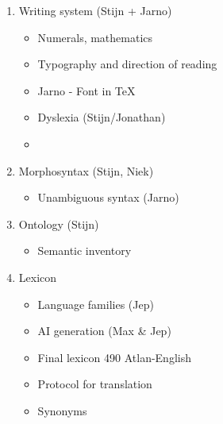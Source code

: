 \documentclass[a3paper]{article}
\begin{document}
\begin{enumerate}
\item Writing system (Stijn + Jarno)                                                                                                                  
\begin{itemize}
\item Numerals, mathematics
\item Typography and direction of reading 
\item Jarno - Font in \TeX
\item Dyslexia (Stijn/Jonathan)
\item {}
\end{itemize}
\item Morphosyntax (Stijn, Niek)                                                                                                                      
\begin{itemize}
\item Unambiguous syntax (Jarno)                                                                                                                       
\end{itemize}
\item Ontology (Stijn)                                                                                                                                
\begin{itemize}
\item Semantic inventory                                                                                                                               
\end{itemize}
\item Lexicon                                                                                                                                         
\begin{itemize}
\item Language families (Jep)                                                                                                                          
\item AI generation (Max \& Jep)                                                                                                                        
\item Final lexicon 490 Atlan-English                                                                                                             \item Protocol for translation
\item Synonyms
\end{itemize}

\end{enumerate}
\end{document}
